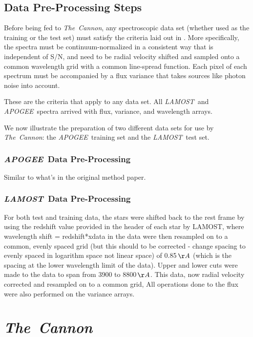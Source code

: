 \documentclass[12pt, preprint]{aastex}
\newcommand{\tc}{\textsl{The~Cannon}}
\newcommand{\apogee}{\textsl{APOGEE}}
\newcommand{\lamost}{\textsl{LAMOST}}
\begin{document}
\subsection{Data Pre-Processing Steps}

Before being fed to \tc, any spectroscopic data set (whether used as the 
training or the test set) must satisfy the criteria laid out in 
\citep{ness2015}. More specifically, the spectra must be
continuum-normalized in a consistent way that is independent of S/N, and need
to be radial velocity shifted and sampled onto a common wavelength grid with
a common line-spread function. Each pixel of each spectrum must be accompanied
by a flux variance that takes sources like photon noise into account. 

These are the criteria that apply to any data set. All \lamost\ and \apogee\
spectra arrived with flux, variance, and wavelength arrays. 

We now illustrate the 
preparation of two different data sets for use by \tc: the \apogee\ training
set and the \lamost\ test set. 

\subsubsection{\apogee\ Data Pre-Processing}

Similar to what's in the original method paper.

\subsubsection{\lamost\ Data Pre-Processing}

For both test and training data, the stars were shifted back to the rest frame 
by using the redshift value provided in the header of each star by LAMOST, 
where wavelength shift = redshift*xdata in the data were then resampled on to 
a common, evenly spaced grid (but this should to be corrected - change spacing 
to evenly spaced in logarithm space not linear space) of 0.85\,$\AA$ 
(which is the spacing at the lower wavelength limit of the data). Upper and 
lower cuts were made to the data to span from 3900 to 8800\,$\AA$.
This data, now radial velocity corrected and resampled on to a common grid, 
All operations done to the flux were also performed 
on the variance arrays. 
\section{\tc}
\end{document}
